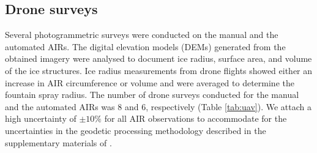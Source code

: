 \documentclass[tc, manuscript]{copernicus}
\begin{document}
\subsection{Drone surveys}

Several photogrammetric surveys were conducted on the manual and the automated AIRs. The digital elevation
models (DEMs) generated from the obtained imagery were analysed to document ice radius, surface area, and volume
of the ice structures. Ice radius measurements from drone flights showed either an increase in AIR circumference
or volume and were averaged to determine the fountain spray radius. The number of drone surveys conducted for
the manual and the automated AIRs was 8 and 6, respectively (Table \ref{tab:uav}). We attach a high uncertainty
of $\pm 10 \%$ for all AIR observations to accommodate for the uncertainties in the geodetic processing
methodology described in the supplementary materials of
\citet{balasubramanianInfluenceMeteorologicalConditions2022}.
\end{document}
